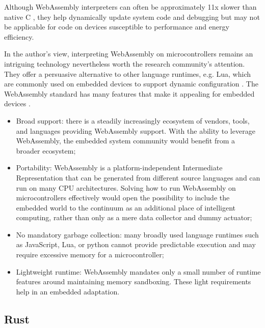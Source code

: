 Although WebAssembly interpreters can often be approximately 11x slower than native C \cite{wasm3-performance}, they help dynamically update system code and debugging but may not be applicable for code on devices susceptible to performance and energy efficiency.

In the author's view, interpreting WebAssembly on microcontrollers remains an intriguing technology nevertheless worth the research community's attention. They offer a persuasive alternative to other language runtimes, e.g. Lua, which are commonly used on embedded devices to support dynamic configuration \cite{brzoza2016embedded}. The WebAssembly standard has many features that make it appealing for embedded devices \cite{peach2020ewasm}.

\begin{itemize}
    \item Broad support: there is a steadily increasingly ecosystem of vendors, tools, and languages providing WebAssembly support. With the ability to leverage WebAssembly, the embedded system community would benefit from a broader ecosystem;
    \item Portability: WebAssembly is a platform-independent Intermediate Representation that can be generated from different source languages and can run on many CPU architectures. Solving how to run WebAssembly on microcontrollers effectively would open the possibility to include the embedded world to the continuum as an additional place of intelligent computing, rather than only as a mere data collector and dummy actuator;
    \item No mandatory garbage collection: many broadly used language runtimes such as JavaScript, Lua, or python cannot provide predictable execution and may require excessive memory for a microcontroller;
    \item Lightweight runtime: WebAssembly mandates only a small number of runtime features around maintaining memory sandboxing. These light requirements help in an embedded adaptation.
\end{itemize}

\subsection{Rust}
\label{sec:rust}

